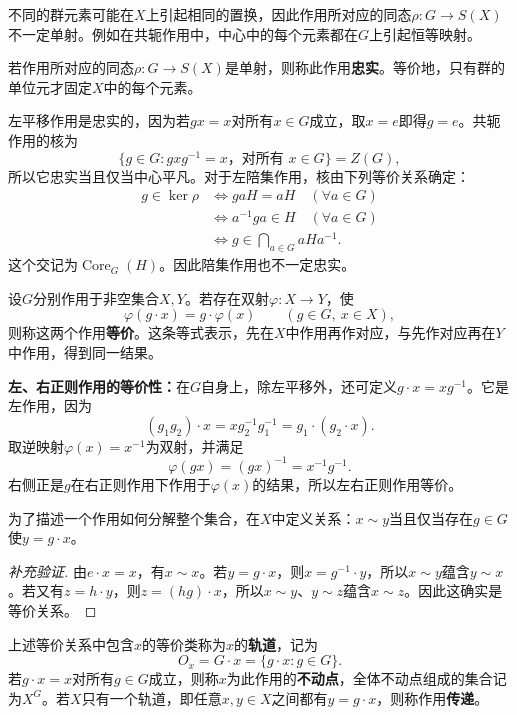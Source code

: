 不同的群元素可能在$X$上引起相同的置换，因此作用所对应的同态$\rho:G\to S(X)$不一定单射。例如在共轭作用中，中心中的每个元素都在$G$上引起恒等映射。

\begin{definition}
若作用所对应的同态$\rho:G\to S(X)$是单射，则称此作用\textbf{忠实}。等价地，只有群的单位元才固定$X$中的每个元素。
\end{definition}

左平移作用是忠实的，因为若$gx=x$对所有$x\in G$成立，取$x=e$即得$g=e$。共轭作用的核为
\[
\{g\in G:gxg^{-1}=x\text{，对所有 }x\in G\}=Z(G),
\]
所以它忠实当且仅当中心平凡。对于左陪集作用，核由下列等价关系确定：
\begin{align*}
g\in\ker\rho
&\iff gaH=aH\quad(\forall a\in G)\\
&\iff a^{-1}ga\in H\quad(\forall a\in G)\\
&\iff g\in\bigcap_{a\in G}aHa^{-1}.
\end{align*}
这个交记为$\operatorname{Core}_G(H)$。因此陪集作用也不一定忠实。

\begin{definition}
设$G$分别作用于非空集合$X,Y$。若存在双射$\varphi:X\to Y$，使
\[
\varphi(g\cdot x)=g\cdot\varphi(x)
\qquad(g\in G,\ x\in X),
\]
则称这两个作用\textbf{等价}。这条等式表示，先在$X$中作用再作对应，与先作对应再在$Y$中作用，得到同一结果。
\end{definition}

\begin{example}
\textbf{左、右正则作用的等价性：}在$G$自身上，除左平移外，还可定义$g\cdot x=xg^{-1}$。它是左作用，因为
\[
(g_1g_2)\cdot x=xg_2^{-1}g_1^{-1}
=g_1\cdot(g_2\cdot x).
\]
取逆映射$\varphi(x)=x^{-1}$为双射，并满足
\[
\varphi(gx)=(gx)^{-1}=x^{-1}g^{-1}.
\]
右侧正是$g$在右正则作用下作用于$\varphi(x)$的结果，所以左右正则作用等价。
\end{example}

为了描述一个作用如何分解整个集合，在$X$中定义关系：$x\sim y$当且仅当存在$g\in G$使$y=g\cdot x$。
\begin{proof}[补充验证]
由$e\cdot x=x$，有$x\sim x$。若$y=g\cdot x$，则$x=g^{-1}\cdot y$，所以$x\sim y$蕴含$y\sim x$。若又有$z=h\cdot y$，则$z=(hg)\cdot x$，所以$x\sim y$、$y\sim z$蕴含$x\sim z$。因此这确实是等价关系。
\end{proof}

\begin{definition}
上述等价关系中包含$x$的等价类称为$x$的\textbf{轨道}，记为
\[
O_x=G\cdot x=\{g\cdot x:g\in G\}.
\]
若$g\cdot x=x$对所有$g\in G$成立，则称$x$为此作用的\textbf{不动点}，全体不动点组成的集合记为$X^G$。若$X$只有一个轨道，即任意$x,y\in X$之间都有$y=g\cdot x$，则称作用\textbf{传递}。
\end{definition}

